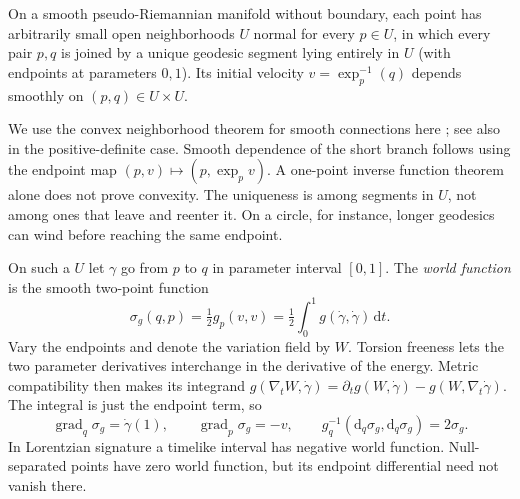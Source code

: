 \begin{theorem}\label{f:convex-normal}
On a smooth pseudo-Riemannian manifold without boundary, each point has arbitrarily small open neighborhoods $U$ normal for every $p\in U$, in which every pair $p,q$ is joined by a unique geodesic segment lying entirely in $U$ (with endpoints at parameters $0,1$). Its initial velocity $v=\exp_p^{-1}(q)$ depends smoothly on $(p,q)\in U\times U$.
\end{theorem}

We use the convex neighborhood theorem for smooth connections here \cite[Ch.~3]{ON}; see also \cite{LeeRM} in the positive-definite case. Smooth dependence of the short branch follows using the endpoint map $(p,v)\mapsto(p,\exp_p v)$. A one-point inverse function theorem alone does not prove convexity. The uniqueness is among segments in $U$, not among ones that leave and reenter it. On a circle, for instance, longer geodesics can wind before reaching the same endpoint.

On such a $U$ let $\gamma$ go from $p$ to $q$ in parameter interval $[0,1]$. The \emph{world function} is the smooth two-point function
\begin{equation}
 \sigma_g(q,p)=\tfrac12 g_p(v,v)=\tfrac12\int_0^1 g(\dot\gamma,\dot\gamma)\,\mathrm dt .\label{f:world-function}
\end{equation}
Vary the endpoints and denote the variation field by $W$. Torsion freeness lets the two parameter derivatives interchange in the derivative of the energy. Metric compatibility then makes its integrand $g(\nabla_tW,\dot\gamma)=\partial_t g(W,\dot\gamma)-g(W,\nabla_t\dot\gamma)$. The integral is just the endpoint term, so
\[
 \operatorname{grad}_q\sigma_g=\dot\gamma(1),\qquad
 \operatorname{grad}_p\sigma_g=-v,\qquad
 g_q^{-1}(\mathrm d_q\sigma_g,\mathrm d_q\sigma_g)=2\sigma_g .
\]
In Lorentzian signature a timelike interval has negative world function. Null-separated points have zero world function, but its endpoint differential need not vanish there.

